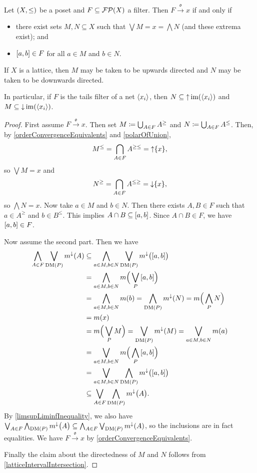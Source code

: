 \begin{proposition} \label{orderConvergenceIntervalBase}
Let $\sSet{X,\leq}$ be a poset and $F\subseteq \operatorname{\mathcal{FP}}(X)$ a filter. Then $F\overset{\mathfrak{o}}{\longrightarrow} x$ \textup{if and only if}
\begin{itemize}
\item there exist sets $M,N\subseteq X$ such that $\bigvee M = x = \bigwedge N$ (and these extrema exist); and
\item $\interval{a,b}\in F$ for all $a\in M$ and $b\in N$.
\end{itemize}
If $X$ is a lattice, then $M$ may be taken to be upwards directed and $N$ may be taken to be downwards directed.
\end{proposition}
In particular, if $F$ is the tails filter of a net $\left\langle x_i \right\rangle$, then $N\subseteq \operatorname{\uparrow}\operatorname{im}(\left\langle x_i \right\rangle)$ and $M\subseteq \operatorname{\downarrow}\operatorname{im}(\left\langle x_i \right\rangle)$.
\begin{proof}
First assume $F\overset{\mathfrak{o}}{\longrightarrow} x$. Then set $M \coloneqq \bigcup_{A\in F}A^\geq$ and $N \coloneqq \bigcup_{A\in F}A^\leq$. Then, by \ref{orderConvergenceEquivalents} and \ref{polarOfUnion},
\[ M^\leq = \bigcap_{A\in F}A^{\geq\leq} = \operatorname{\uparrow}\{x\}, \]
so $\bigvee M = x$ and
\[ N^\geq = \bigcap_{A\in F}A^{\leq\geq} = \operatorname{\downarrow}\{x\}, \]
so $\bigwedge N = x$. Now take $a\in M$ and $b\in N$. Then there exists $A,B\in F$ such that $a\in A^\geq$ and $b\in B^\leq$. This implies $A\cap B \subseteq \interval{a,b}$. Since $A\cap B\in F$, we have $\interval{a,b}\in F$.

Now assume the second part. Then we have
\begin{align*}
\bigwedge_{A\in F}\bigvee_{\DM(P)} m^\imf(A) &\subseteq \bigwedge_{a\in M, b\in N}\bigvee_{\DM(P)} m^\imf\big(\interval{a,b}\big) \\
&= \bigwedge_{a\in M, b\in N} m\Big(\bigvee_{P}\interval{a,b}\Big) \\
&= \bigwedge_{a\in M, b\in N} m(b) = \bigwedge_{\DM(P)} m^\imf(N) = m\Big(\bigwedge_P N\Big) \\
&= m(x) \\
&= m\Big(\bigvee_P M\Big) = \bigvee_{\DM(P)} m^\imf(M) = \bigvee_{a\in M, b\in N} m(a) \\
&= \bigvee_{a\in M, b\in N} m\Big(\bigwedge_{P}\interval{a,b}\Big) \\
&= \bigvee_{a\in M, b\in N}\bigwedge_{\DM(P)} m^\imf\big(\interval{a,b}\big) \\
&\subseteq \bigvee_{A\in F}\bigwedge_{\DM(P)} m^\imf\big(A\big).
\end{align*}
By \ref{limsupLiminfInequality}, we also have $\bigvee_{A\in F}\bigwedge_{\operatorname{DM}(P)} m^\downarrow\big(A\big) \subseteq \bigwedge_{A\in F}\bigvee_{\operatorname{DM}(P)} m^\downarrow(A)$, so the inclusions are in fact equalities. We have $F\overset{\mathfrak{o}}{\longrightarrow} x$ by \ref{orderConvergenceEquivalents}.

Finally the claim about the directedness of $M$ and $N$ follows from \ref{latticeIntervalIntersection}.
\end{proof}


